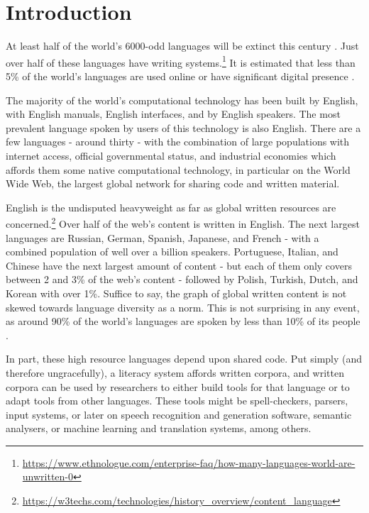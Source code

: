 \section{Introduction}
\label{sec:intro}

At least half of the world's 6000-odd languages will be extinct this century \citep{krauss92, grenoble2011cambridge}. Just over half of these languages have writing systems.\footnote{\href{https://www.ethnologue.com/enterprise-faq/how-many-languages-world-are-unwritten-0}{https://www.ethnologue.com/enterprise-faq/how-many-languages-world-are-unwritten-0}} It is estimated that less than 5\% of the world's languages are used online or have significant digital presence \citep{kornai2013digital}.

The majority of the world's computational technology has been built by English, with English manuals, English interfaces, and by English speakers. The most prevalent language spoken by users of this technology is also English. There are a few languages - around thirty - with the combination of large populations with internet access, official governmental status, and industrial economies which affords them some native computational technology, in particular on the World Wide Web, the largest global network for sharing code and written material.

English is the undisputed heavyweight as far as global written resources are concerned.\footnote{\href{https://w3techs.com/technologies/history\_overview/content\_language}{https://w3techs.com/technologies/history\_overview/content\_language}} Over half of the web's content is written in English. The next largest languages are Russian, German, Spanish, Japanese, and French - with a combined population of well over a billion speakers. Portuguese, Italian, and Chinese have the next largest amount of content - but each of them only covers between 2 and 3\% of the web's content - followed by Polish, Turkish, Dutch, and Korean with over 1\%. Suffice to say, the graph of global written content is not skewed towards language diversity as a norm. This is not surprising in any event, as around 90\% of the world's languages are spoken by less than 10\% of its people \citep{bernard1992preserving}.

In part, these high resource languages depend upon shared code. Put simply (and therefore ungracefully), a literacy system affords written corpora, and written corpora can be used by researchers to either build tools for that language or to adapt tools from other languages. These tools might be spell-checkers, parsers, input systems, or later on speech recognition and generation software, semantic analysers, or machine learning and translation systems, among others.

